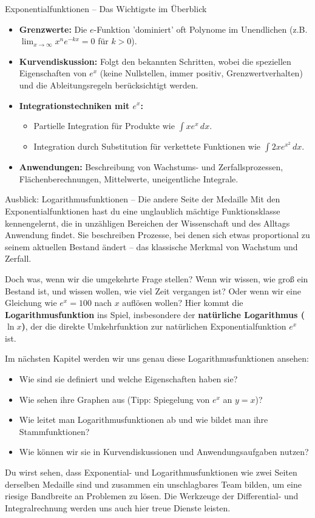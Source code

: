 \begin{kurzknappumgebung}{Exponentialfunktionen – Das Wichtigste im Überblick}
\begin{itemize}
    \item \textbf{Grenzwerte:} Die $e$-Funktion 'dominiert' oft Polynome im Unendlichen (z.B. $\lim_{x\to\infty} x^n e^{-kx} = 0$ für $k>0$).
    \item \textbf{Kurvendiskussion:} Folgt den bekannten Schritten, wobei die speziellen Eigenschaften von $e^x$ (keine Nullstellen, immer positiv, Grenzwertverhalten) und die Ableitungsregeln berücksichtigt werden.
    \item \textbf{Integrationstechniken mit $e^x$:}
        \begin{itemize}
            \item Partielle Integration für Produkte wie $\int x e^x \,dx$.
            \item Integration durch Substitution für verkettete Funktionen wie $\int 2x e^{x^2} \,dx$.
        \end{itemize}
    \item \textbf{Anwendungen:} Beschreibung von Wachstums- und Zerfallsprozessen, Flächenberechnungen, Mittelwerte, uneigentliche Integrale.
\end{itemize}
\end{kurzknappumgebung}

\begin{infoboxumgebung}{Ausblick: Logarithmusfunktionen – Die andere Seite der Medaille}
Mit den Exponentialfunktionen hast du eine unglaublich mächtige Funktionsklasse kennengelernt, die in unzähligen Bereichen der Wissenschaft und des Alltags Anwendung findet. Sie beschreiben Prozesse, bei denen sich etwas proportional zu seinem aktuellen Bestand ändert – das klassische Merkmal von Wachstum und Zerfall.

Doch was, wenn wir die umgekehrte Frage stellen? Wenn wir wissen, wie groß ein Bestand ist, und wissen wollen, wie viel Zeit vergangen ist? Oder wenn wir eine Gleichung wie $e^x = 100$ nach $x$ auflösen wollen? Hier kommt die \textbf{Logarithmusfunktion} ins Spiel, insbesondere der \textbf{natürliche Logarithmus ($\ln x$)}, der die direkte Umkehrfunktion zur natürlichen Exponentialfunktion $e^x$ ist.

Im nächsten Kapitel werden wir uns genau diese Logarithmusfunktionen ansehen:
\begin{itemize}
    \item Wie sind sie definiert und welche Eigenschaften haben sie?
    \item Wie sehen ihre Graphen aus (Tipp: Spiegelung von $e^x$ an $y=x$)?
    \item Wie leitet man Logarithmusfunktionen ab und wie bildet man ihre Stammfunktionen?
    \item Wie können wir sie in Kurvendiskussionen und Anwendungsaufgaben nutzen?
\end{itemize}
Du wirst sehen, dass Exponential- und Logarithmusfunktionen wie zwei Seiten derselben Medaille sind und zusammen ein unschlagbares Team bilden, um eine riesige Bandbreite an Problemen zu lösen. Die Werkzeuge der Differential- und Integralrechnung werden uns auch hier treue Dienste leisten.
\end{infoboxumgebung}



